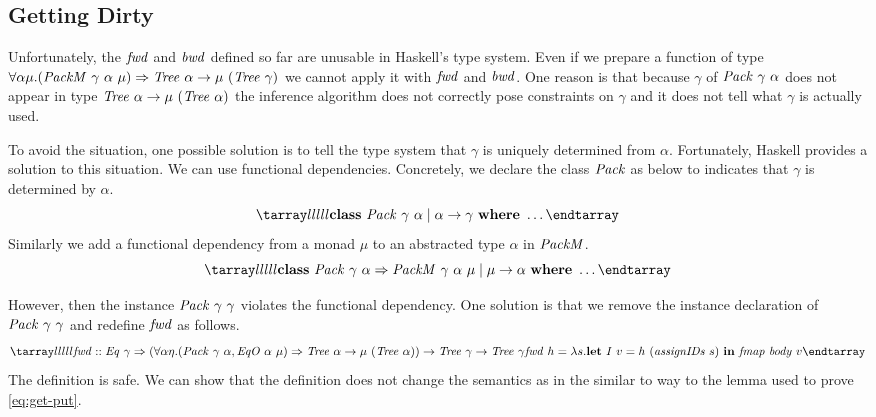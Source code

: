 \documentclass{article}
\theoremstyle{definition}
\begin{document}
\subsection{Getting Dirty}
Unfortunately, the $\mathit{fwd}$ and $\mathit{bwd}$ defined so far are unusable in 
Haskell's type system. Even if we prepare a function of type 
$\forall \alpha \mu. (\mathit{PackM}~\gamma~\alpha~\mu) \Rightarrow \mathit{Tree}~\alpha \to \mu~(\mathit{Tree}~\gamma)$ we cannot apply it with $\mathit{fwd}$ and $\mathit{bwd}$. One reason is that 
because $\gamma$ of $\mathit{Pack}~\gamma~\alpha$ does not appear in type 
$\mathit{Tree}~\alpha \to \mu~(\mathit{Tree}~\alpha)$ the inference algorithm does not 
correctly pose constraints on $\gamma$ and it does not tell what $\gamma$ is actually used. 

To avoid the situation, one possible solution is to tell the type system that $\gamma$ is uniquely determined from $\alpha$. Fortunately, Haskell provides 
a solution to this situation. We can use functional dependencies. 
Concretely, we declare the class $\mathit{Pack}$ as below to indicates that $\gamma$ is determined by $\alpha$.
\[
\bb
 \key{class}~\mi{Pack}~\gamma~\alpha \mid \alpha \to \gamma 
  ~\key{where}~ \dots
\ee
\]
Similarly we add a functional dependency from a monad $\mu$ to an abstracted type $\alpha$ in $\mathit{PackM}$. 
\[
\bb
 \key{class}~\mi{Pack}~\gamma~\alpha \Rightarrow \mi{PackM}~\gamma~\alpha~\mu \mid \mu \to \alpha
  ~\key{where}~ \dots
\ee
\]


However, then the instance $\mathit{Pack}~\gamma~\gamma$ violates the functional dependency. One solution is that we remove the instance declaration of $\mathit{Pack}~\gamma~\gamma$ and redefine $\mathit{fwd}$ as follows. 
\[
\bb
\mi{fwd} :: \mi{Eq}~\gamma \Rightarrow (
 \forall \alpha \eta. (\mi{Pack}~\gamma~\alpha, \mi{EqO}~\alpha~\mu) \Rightarrow 
 \mi{Tree}~\alpha \to \mu~(\mi{Tree}~\alpha))
 \to \mi{Tree}~\gamma \to \mi{Tree}~\gamma\\
\mi{fwd}~h = \lambda s. 
    \key{let}~\mi{I}~v = h~(\mi{assignIDs}~s)~\key{in}~\mi{fmap}~\mi{body}~v 
\ee
\]
The definition is safe. We can show that the definition does not change the semantics as in the similar to way to the lemma used to prove \ref{eq:get-put}.




\end{document}
